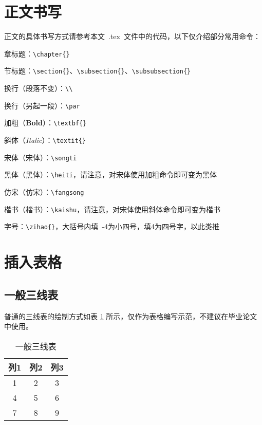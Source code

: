 \documentclass{GZHUMaster}
\begin{document}
\section{正文书写}
正文的具体书写方式请参考本文~.tex~文件中的代码，以下仅介绍部分常用命令：\par
章标题：\verb|\chapter{}|\par
节标题：\verb|\section{}|、\verb|\subsection{}|、\verb|\subsubsection{}|\par
换行（段落不变）：\verb|\\|\par
换行（另起一段）：\verb|\par|\par
加粗（\textbf{Bold}）：\verb|\textbf{}|\par
斜体（\textit{Italic}）：\verb|\textit{}|\par
宋体（{\songti 宋体}）：\verb|\songti|\par
黑体（{\heiti 黑体}）：\verb|\heiti|，请注意，对宋体使用加粗命令即可变为黑体\par
仿宋（{\fangsong 仿宋}）：\verb|\fangsong|\par
楷书（{\kaishu 楷书}）：\verb|\kaishu|，请注意，对宋体使用斜体命令即可变为楷书\par
字号：\verb|\zihao{}|，大括号内填~-4为小四号，填4为四号字，以此类推
\section{插入表格}
\subsection{一般三线表}
普通的三线表的绘制方式如表 \ref{tab2} 所示，仅作为表格编写示范，不建议在毕业论文中使用。
\begin{table}[h]
  \centering
  \caption{一般三线表}
  \begin{tabular}{ccc}
    \hline
    列1 & 列2 & 列3 \\
    \hline
    1 & 2 & 3 \\
    4 & 5 & 6 \\
    7 & 8 & 9 \\
    \hline
  \end{tabular}
  \label{tab2}
\end{table}
\end{document}
